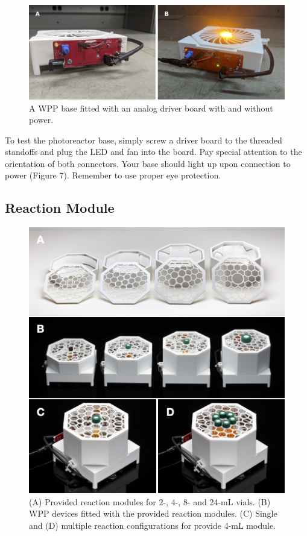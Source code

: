 \documentclass[11pt]{article}
\begin{document}
\begin{figure}[H]
	\includegraphics[width=\textwidth]{"./fig7.png"}
	\caption{A WPP base fitted with an analog driver board with and without power.}
\end{figure}

To test the photoreactor base, simply screw a driver board to the threaded standoffs and plug the LED and fan into the board.
Pay special attention to the orientation of both connectors.
Your base should light up upon connection to power (Figure 7).
Remember to use proper eye protection.

\clearpage

\subsection{Reaction Module} \label{SEC:enclosure}

\begin{figure}[H]
	\includegraphics[width=\textwidth]{"./fig8.png"}
	\caption{(A) Provided reaction modules for 2-, 4-, 8- and 24-mL vials. (B) WPP devices fitted with the provided reaction modules. (C) Single and (D) multiple reaction configurations for provide 4-mL module.}
\end{figure}
\end{document}
